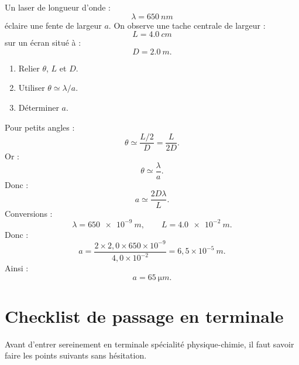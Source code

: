 \documentclass[11pt,a4paper]{article}
\begin{document}
\begin{exercice}[5 — Diffraction]
Un laser de longueur d'onde :
\[
\lambda=\SI{650}{nm}
\]
éclaire une fente de largeur $a$.  
On observe une tache centrale de largeur :
\[
L=\SI{4.0}{cm}
\]
sur un écran situé à :
\[
D=\SI{2.0}{m}.
\]

\begin{enumerate}
  \item Relier $\theta$, $L$ et $D$.
  \item Utiliser $\theta\simeq \lambda/a$.
  \item Déterminer $a$.
\end{enumerate}

\begin{methode}[Correction]
Pour petits angles :
\[
\theta\simeq \frac{L/2}{D}=\frac{L}{2D}.
\]
Or :
\[
\theta\simeq \frac{\lambda}{a}.
\]
Donc :
\[
a\simeq \frac{2D\lambda}{L}.
\]
Conversions :
\[
\lambda=\SI{650e-9}{m},
\qquad
L=\SI{4.0e-2}{m}.
\]
Donc :
\[
a=\frac{2\times2{,}0\times650\times10^{-9}}{4{,}0\times10^{-2}}
=6{,}5\times10^{-5}\ \si{m}.
\]
Ainsi :
\[
a=\SI{65}{\micro m}.
\]
\end{methode}
\end{exercice}

\section{Checklist de passage en terminale}

\begin{objectif}
Avant d'entrer sereinement en terminale spécialité physique-chimie, il faut savoir faire les points suivants sans hésitation.
\end{objectif}
\end{document}
